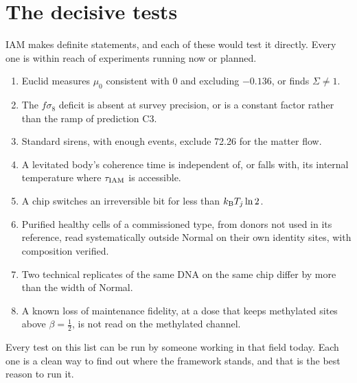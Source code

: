 \section{The decisive tests}
IAM makes definite statements, and each of these would test it directly. Every one is within reach of experiments running now or planned.
\begin{enumerate}
\item Euclid measures $\mu_0$ consistent with 0 and excluding $-0.136$, or finds $\Sigma\ne1$.
\item The $f\sigma_8$ deficit is absent at survey precision, or is a constant factor rather than the ramp of prediction C3.
\item Standard sirens, with enough events, exclude 72.26 for the matter flow.
\item A levitated body's coherence time is independent of, or falls with, its internal temperature where $\tau_{\rm IAM}$ is accessible.
\item A chip switches an irreversible bit for less than $k_{\mathrm B} T_j\ln2$.
\item Purified healthy cells of a commissioned type, from donors not used in its reference, read systematically outside Normal on their own
      identity sites, with composition verified.
\item Two technical replicates of the same DNA on the same chip differ by more than the width of Normal.
\item A known loss of maintenance fidelity, at a dose that keeps methylated sites above $\beta=\tfrac12$, is not read on the methylated channel.
\end{enumerate}

Every test on this list can be run by someone working in that field today. Each one is a clean way to find out where the framework stands, and that is the best reason to run it.

